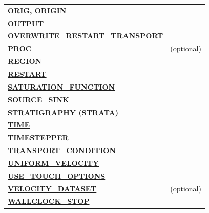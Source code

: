 \begin{longtable}{ll}
\hyperlink{target_orig}{\bf ORIG, ORIGIN} & \\
\hyperlink{target_output}{\bf OUTPUT} & \\
\hyperlink{target_overwrite}{\bf OVERWRITE\_RESTART\_TRANSPORT} & \\
\hyperlink{target_proc}{\bf PROC} & (optional)\\
\hyperlink{target_region}{\bf REGION} & \\
\hyperlink{target_restart}{\bf RESTART} & \\
\hyperlink{target_sat}{\bf SATURATION\_FUNCTION} & \\
\hyperlink{target_src}{\bf SOURCE\_SINK} & \\
\hyperlink{target_strata}{\bf STRATIGRAPHY (STRATA)} & \\
\hyperlink{target_time}{\bf TIME} & \\
\hyperlink{target_timestep}{\bf TIMESTEPPER} & \\
\hyperlink{target_trans_cond}{\bf TRANSPORT\_CONDITION} & \\
\hyperlink{target_unifvel}{\bf UNIFORM\_VELOCITY} & \\
\hyperlink{target_touch}{\bf USE\_TOUCH\_OPTIONS} & \\
\hyperlink{target_veldata}{\bf VELOCITY\_DATASET} & (optional) \\
\hyperlink{target_wallclk}{\bf WALLCLOCK\_STOP} & \\
\bottomrule[1.5pt]
\end{longtable}

\clearpage

